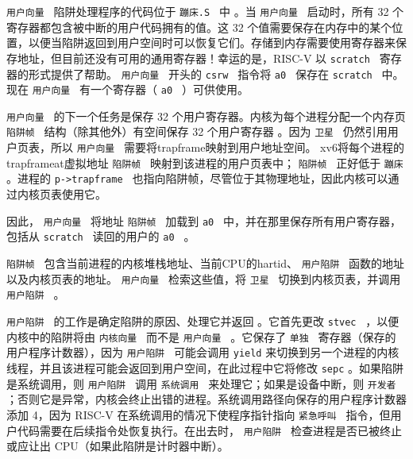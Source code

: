\documentclass[UTF8]{article}
\begin{document}
 {    \tt    用户向量   }  陷阱处理程序的代码位于  {    \tt    蹦床.S   }  中
        。当  {    \tt    用户向量   }  启动时，所有 32 个寄存器都包含被中断的用户代码拥有的值。这 32 个值需要保存在内存中的某个位置，以便当陷阱返回到用户空间时可以恢复它们。存储到内存需要使用寄存器来保存地址，但目前还没有可用的通用寄存器！幸运的是，RISC-V 以  {    \tt    scratch   }  寄存器的形式提供了帮助。  {    \tt    用户向量   }  开头的  {    \tt    csrw   }  指令将  {    \tt    a0   }  保存在  {    \tt    scratch   }  中。现在
  {    \tt    用户向量   }  有一个寄存器（  {    \tt    a0   }  ）可供使用。  

 {    \tt    用户向量   }  的下一个任务是保存 32 个用户寄存器。内核为每个进程分配一个内存页
  {    \tt    陷阱帧   }  结构（除其他外）有空间保存 32 个用户寄存器
        。因为 {    \tt    卫星   } 仍然引用用户页表，所以 {    \tt    用户向量   } 需要将trapframe映射到用户地址空间。 xv6将每个进程的trapframeat虚拟地址 {    \tt    陷阱帧   } 映射到该进程的用户页表中；
  {    \tt    陷阱帧   }  正好低于  {    \tt    蹦床   }  。进程的  {    \tt    p->trapframe   }  也指向陷阱帧，尽管位于其物理地址，因此内核可以通过内核页表使用它。  

因此， {    \tt    用户向量   }  将地址  {    \tt    陷阱帧   }  加载到  {    \tt    a0   }  中，并在那里保存所有用户寄存器，包括从  {    \tt    scratch   }  读回的用户的  {    \tt    a0   }  。  

 {    \tt    陷阱帧   } 包含当前进程的内核堆栈地址、当前CPU的hartid、 {    \tt    用户陷阱   } 函数的地址以及内核页表的地址。  {    \tt    用户向量   }  检索这些值，将  {    \tt    卫星   }  切换到内核页表，并调用  {    \tt    用户陷阱   }  。  

 {    \tt    用户陷阱   } 的工作是确定陷阱的原因、处理它并返回
        。它首先更改  {    \tt    stvec   } ，以便内核中的陷阱将由
  {    \tt    内核向量   }  而不是  {    \tt    用户向量   }  。它保存了 {    \tt    单独   } 寄存器（保存的用户程序计数器），因为
  {    \tt    用户陷阱   }  可能会调用    \lstinline{yield}    来切换到另一个进程的内核线程，并且该进程可能会返回到用户空间，在此过程中它将修改    \lstinline{sepc}    。如果陷阱是系统调用，则  {    \tt    用户陷阱   }  调用  {    \tt    系统调用   }  来处理它；如果是设备中断，则  {    \tt    开发者   }  ；否则它是异常，内核会终止出错的进程。系统调用路径向保存的用户程序计数器添加 4，因为 RISC-V 在系统调用的情况下使程序指针指向  {    \tt    紧急呼叫   }  指令，但用户代码需要在后续指令处恢复执行。在出去时， {    \tt    用户陷阱   }  检查进程是否已被终止或应让出 CPU（如果此陷阱是计时器中断）。  
\end{document}
